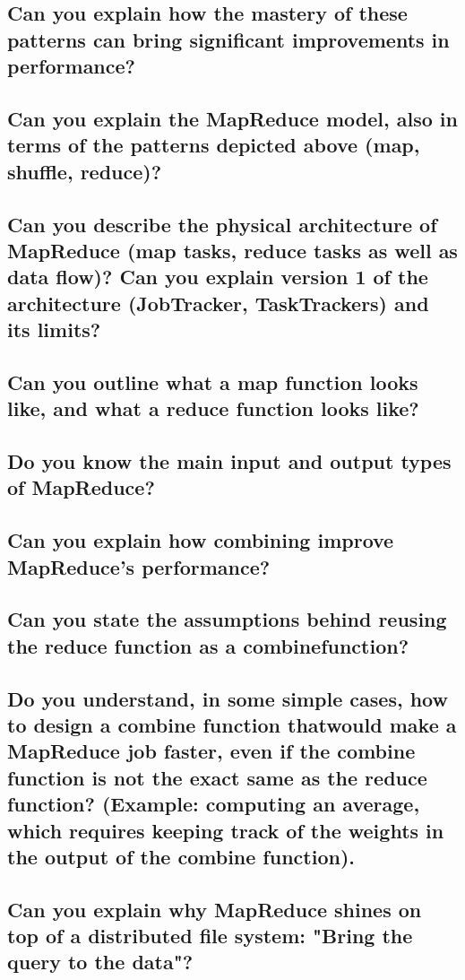 \documentclass{article}
\begin{document}
\subsection{Can you explain how the mastery of these patterns can bring significant improvements in performance?}
\subsection{Can you explain the MapReduce model, also in terms of the patterns depicted above (map, shuffle, reduce)?}
\subsection{Can you describe the physical architecture of MapReduce (map tasks, reduce tasks as well as data flow)? Can you explain version 1 of the architecture (JobTracker, TaskTrackers) and its limits?}
\subsection{Can you outline what a map function looks like, and what a reduce function looks like?}
\subsection{Do you know the main input and output types of MapReduce?}
\subsection{Can you explain how combining improve MapReduce's performance?}
\subsection{Can you state the assumptions behind reusing the reduce function as a combinefunction?}
\subsection{Do you understand, in some simple cases, how to design a combine function thatwould make a MapReduce job faster, even if the combine function is not the exact same as the reduce function? (Example: computing an average, which requires keeping track of the weights in the output of the combine function).}
\subsection{Can you explain why MapReduce shines on top of a distributed file system: "Bring the query to the data"?}
\end{document}

